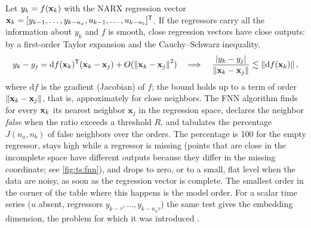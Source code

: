 Let $y_k=f(\mathbf{x}_k)$ with the NARX regression vector $\mathbf{x}_k=[y_{k-1},\allowbreak\dots,\allowbreak y_{k-n_a},\allowbreak u_{k-1},\allowbreak\dots,\allowbreak u_{k-n_b}]^{\mathsf{T}}$. If the regressors carry all the information about $y_k$ and $f$ is smooth, close regression vectors have close outputs: by a first-order Taylor expansion and the Cauchy--Schwarz inequality,
\begin{equation}
  y_k-y_j=\mathrm{d}f(\mathbf{x}_k)^{\mathsf{T}}(\mathbf{x}_k-\mathbf{x}_j)+O(\left\lVert \mathbf{x}_k-\mathbf{x}_j \right\rVert^2)\quad\Longrightarrow\quad
  \frac{\left\lvert y_k-y_j \right\rvert}{\left\lVert \mathbf{x}_k-\mathbf{x}_j \right\rVert}\lesssim\left\lVert \mathrm{d}f(\mathbf{x}_k) \right\rVert,
  \label{eq:ts:fnnbound}
\end{equation}
where $\mathrm{d}f$ is the gradient (Jacobian) of $f$; the bound holds up to a term of order $\left\lVert \mathbf{x}_k-\mathbf{x}_j \right\rVert$, that is, approximately for close neighbors. The FNN algorithm \cite{kennel:1992:fnn,rhodes:1998:fnn} finds for every $\mathbf{x}_k$ its nearest neighbor $\mathbf{x}_j$ in the regression space, declares the neighbor \emph{false} when the ratio exceeds a threshold $R$, and tabulates the percentage $J(n_a,n_b)$ of false neighbors over the orders. The percentage is 100 for the empty regressor, stays high while a regressor is missing (points that are close in the incomplete space have different outputs because they differ in the missing coordinate; see \cref{fig:ts:fnn}), and drops to zero, or to a small, flat level when the data are noisy, as soon as the regression vector is complete. The smallest order in the corner of the table where this happens is the model order. For a scalar time series ($u$ absent, regressors $y_{k-\tau},\dots,y_{k-n_a\tau}$) the same test gives the embedding dimension, the problem for which it was introduced \cite{kennel:1992:fnn}.

